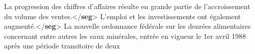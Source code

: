 \begin{shaded}
\hspace*{1em}La progression des chiffres d'affaires\mbox{}\newline 
\hspace*{1em}\hspace*{1em}\hspace*{1em}\hspace*{1em} résulte en grande partie de l'accroissement du volume\mbox{}\newline 
\hspace*{1em}\hspace*{1em}\hspace*{1em}\hspace*{1em} des ventes.{</\textbf{seg}>}\mbox{}\newline 
\hspace*{1em}L'emploi et les investissements ont\mbox{}\newline 
\hspace*{1em}\hspace*{1em}\hspace*{1em}\hspace*{1em} également augmenté.{</\textbf{seg}>}\mbox{}\newline 
\hspace*{1em}La nouvelle ordonnance fédérale sur\mbox{}\newline 
\hspace*{1em}\hspace*{1em}\hspace*{1em}\hspace*{1em} les denrées alimentaires concernant entre autres les\mbox{}\newline 
\hspace*{1em}\hspace*{1em}\hspace*{1em}\hspace*{1em} eaux minérales, entrée en vigueur le 1er avril\mbox{}\newline 
\hspace*{1em}\hspace*{1em}\hspace*{1em}\hspace*{1em} 1988 après une période transitoire de deux\mbox{}\newline 

\end{shaded}
